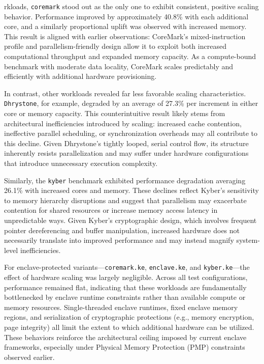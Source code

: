 rkloads, \texttt{coremark} stood out as the only one to exhibit consistent, positive scaling behavior. Performance improved by approximately 40.8\% with each additional core, and a similarly proportional uplift was observed with increased memory. This result is aligned with earlier observations: CoreMark’s mixed-instruction profile and parallelism-friendly design allow it to exploit both increased computational throughput and expanded memory capacity. As a compute-bound benchmark with moderate data locality, CoreMark scales predictably and efficiently with additional hardware provisioning.

In contrast, other workloads revealed far less favorable scaling characteristics. \texttt{Dhrystone}, for example, degraded by an average of 27.3\% per increment in either core or memory capacity. This counterintuitive result likely stems from architectural inefficiencies introduced by scaling: increased cache contention, ineffective parallel scheduling, or synchronization overheads may all contribute to this decline. Given Dhrystone’s tightly looped, serial control flow, its structure inherently resists parallelization and may suffer under hardware configurations that introduce unnecessary execution complexity.

Similarly, the \texttt{kyber} benchmark exhibited performance degradation averaging 26.1\% with increased cores and memory. These declines reflect Kyber’s sensitivity to memory hierarchy disruptions and suggest that parallelism may exacerbate contention for shared resources or increase memory access latency in unpredictable ways. Given Kyber’s cryptographic design, which involves frequent pointer dereferencing and buffer manipulation, increased hardware does not necessarily translate into improved performance and may instead magnify system-level inefficiencies.

For enclave-protected variants—\texttt{coremark.ke}, \texttt{enclave.ke}, and \texttt{kyber.ke}—the effect of hardware scaling was largely negligible. Across all test configurations, performance remained flat, indicating that these workloads are fundamentally bottlenecked by enclave runtime constraints rather than available compute or memory resources. Single-threaded enclave runtimes, fixed enclave memory regions, and serialization of cryptographic protections (e.g., memory encryption, page integrity) all limit the extent to which additional hardware can be utilized. These behaviors reinforce the architectural ceiling imposed by current enclave frameworks, especially under Physical Memory Protection (PMP) constraints observed earlier.


